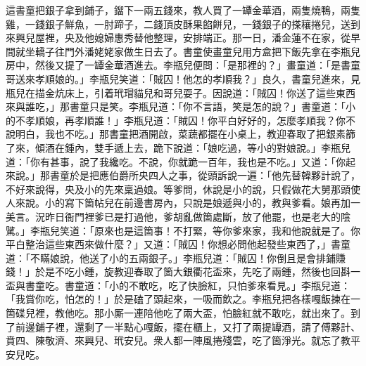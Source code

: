 這書童把銀子拿到鋪子，鎦下一兩五錢來，教人買了一罈金華酒，兩隻燒鴨，兩隻雞，一錢銀子鮮魚，一肘蹄子，二錢頂皮酥果餡餅兒，一錢銀子的搽穰捲兒，送到來興兒屋裡，央及他媳婦惠秀替他整理，安排端正。那一日，潘金蓮不在家，從早間就坐轎子往門外潘姥姥家做生日去了。書童使畫童兒用方盒把下飯先拿在李瓶兒房中，然後又提了一罈金華酒進去。李瓶兒便問：「是那裡的？」畫童道：「是書童哥送來孝順娘的。」李瓶兒笑道：「賊囚！他怎的孝順我？」良久，書童兒進來，見瓶兒在描金炕床上，引着玳瑁貓兒和哥兒耍子。因說道：「賊囚！你送了這些東西來與誰吃，」那書童只是笑。李瓶兒道：「你不言語，笑是怎的說？」書童道：「小的不孝順娘，再孝順誰！」{}李瓶兒道：「賊囚！你平白好好的，怎麼孝順我？你不說明白，我也不吃。」那書童把酒開啟，菜蔬都擺在小桌上，教迎春取了把銀素篩了來，傾酒在鍾內，雙手遞上去，跪下說道：「娘吃過，等小的對娘說。」李瓶兒道：「你有甚事，說了我纔吃。不說，你就跪一百年，我也是不吃。」又道：「你起來說。」那書童於是把應伯爵所央四人之事，從頭訴說一遍：「他先替韓夥計說了，不好來說得，央及小的先來稟過娘。等爹問，休說是小的說，只假做花大舅那頭使人來說。小的寫下箇帖兒在前邊書房內，只說是娘遞與小的，教與爹看。娘再加一美言。況昨日衙門裡爹已是打過他，爹胡亂做箇處斷，放了他罷，也是老大的陰騭。」李瓶兒笑道：「原來也是這箇事！不打緊，等你爹來家，我和他說就是了。你平白整治這些東西來做什麼？」又道：「賊囚！你想必問他起發些東西了，」書童道：「不瞞娘說，他送了小的五兩銀子。」李瓶兒道：「賊囚！你倒且是會排鋪賺錢！」於是不吃小鍾，旋教迎春取了箇大銀衢花盃來，先吃了兩鍾，然後也回斟一盃與書童吃。書童道：「小的不敢吃，吃了快臉紅，只怕爹來看見。」李瓶兒道：「我賞你吃，怕怎的！」於是磕了頭起來，一吸而飲之。李瓶兒把各樣嘎飯揀在一箇碟兒裡，教他吃。那小厮一連陪他吃了兩大盃，怕臉紅就不敢吃，就出來了。到了前邊鋪子裡，還剩了一半點心嘎飯，擺在櫃上，又打了兩提罈酒，請了傅夥計、賁四、陳敬濟、來興兒、玳安兒。衆人都一陣風捲殘雲，吃了箇淨光。就忘了教平安兒吃。

